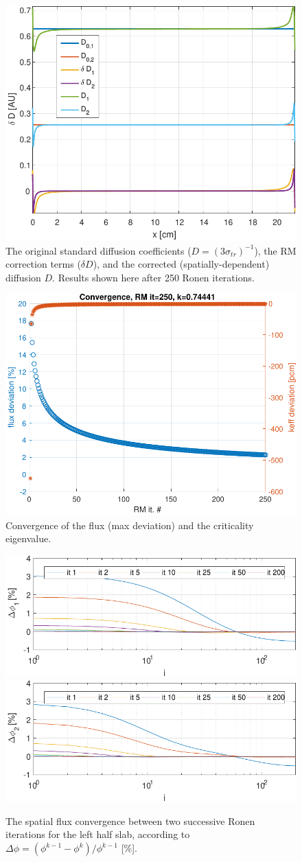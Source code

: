 \begin{figure}[htbp!]
	\centering
	\includegraphics[width=0.45\linewidth]{D_coeffs.pdf}
	\caption{The original standard diffusion coefficients ($D=(3\sigma_{tr})^{-1}$),
		the RM correction terms ($\delta D$), and the corrected (spatially-dependent)
		diffusion $D$. Results shown here after 250 Ronen iterations.}
	\label{fig:Dcoef}
\end{figure}

\begin{figure}[htbp!]
	\centering
	\includegraphics[width=0.45\linewidth]{convergence.pdf}
	\caption{Convergence of the flux (max deviation) and the criticality
		eigenvalue.}
	\label{fig:conv}
\end{figure}

\begin{figure}[htbp!]
	\centering
	\includegraphics[width=0.45\linewidth]{flux_deviation_half_it_1.pdf}
	\includegraphics[width=0.45\linewidth]{flux_deviation_half_it_2.pdf}
	\caption{The spatial flux convergence between two successive Ronen iterations for the left half slab, according to $\Delta\phi = (\phi^{k-1}-\phi^k)/\phi^{k-1}$ [\%].}
	\label{fig:conv2}
\end{figure}

